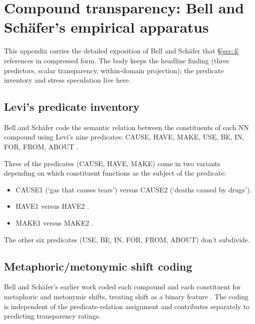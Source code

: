 \section{Compound transparency: Bell and Schäfer's empirical apparatus}

This appendix carries the detailed exposition of Bell and Schäfer \autocite*{bell-schafer-2016-modelling-transparency} that §\ref{sec:4} references in compressed form. The body keeps the headline finding (three predictors, scalar transparency, within-domain projection); the predicate inventory and stress speculation live here.

\subsection{Levi's predicate inventory}\label{sec:B-1}

Bell and Schäfer code the semantic relation between the constituents of each NN compound using Levi's \autocite*{levi-1978-complex-nominals} nine predicates: CAUSE, HAVE, MAKE, USE, BE, IN, FOR, FROM, ABOUT \autocite[167]{bell-schafer-2016-modelling-transparency}.

Three of the predicates (CAUSE, HAVE, MAKE) come in two variants depending on which constituent functions as the subject of the predicate:

\begin{itemize}
\tightlist
\item
  CAUSE1  (`gas that causes tears') versus CAUSE2  (`deaths caused by drugs').
\item
  HAVE1  versus HAVE2 .
\item
  MAKE1  versus MAKE2 .
\end{itemize}

The other six predicates (USE, BE, IN, FOR, FROM, ABOUT) don't subdivide.

\subsection{Metaphoric/metonymic shift coding}

Bell and Schäfer's earlier work coded each compound and each constituent for metaphoric and metonymic shifts, treating shift as a binary feature \autocite[167]{bell-schafer-2016-modelling-transparency}. The coding is independent of the predicate-relation assignment and contributes separately to predicting transparency ratings.

